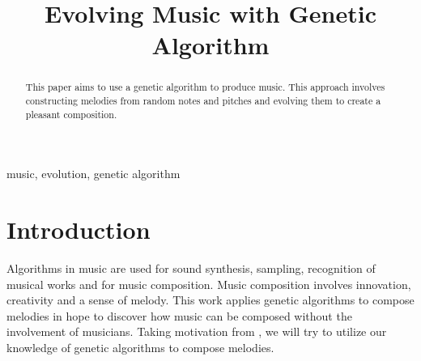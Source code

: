 \documentclass[conference]{IEEEtran}
\begin{document}
\title{Evolving Music with Genetic Algorithm%
}

\author{
\and
{}
\and
{}
}




\maketitle

\begin{abstract}
This paper aims to use a genetic algorithm to produce music. This approach involves constructing melodies from random notes and pitches and evolving them to create a pleasant composition.
\end{abstract}

\begin{IEEEkeywords}
music, evolution, genetic algorithm
\end{IEEEkeywords}

\section{Introduction}
Algorithms in music are used for sound synthesis, sampling, recognition of musical works and for music composition. Music composition involves innovation, creativity and a sense of melody. This work applies genetic algorithms to compose melodies in hope to discover how music can be composed without the involvement of musicians. Taking motivation from \cite{b1}, we will try to utilize our knowledge of genetic algorithms to compose melodies.
\end{document}
